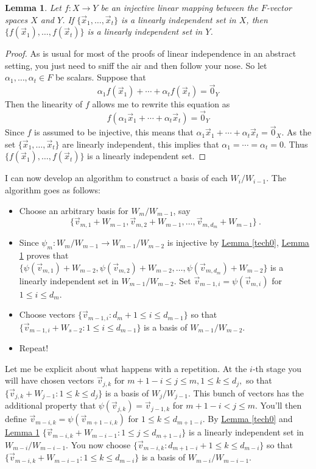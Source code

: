 \documentclass[11pt]{amsbook}
\newtheorem{lemma}[theorem]{Lemma}
\theoremstyle{definition}
\begin{document}
\begin{lemma}\label{tech1}
Let $f: X \to Y$ be an injective linear mapping between the $F$-vector spaces $X$ and $Y$. If $\{ \vec{x}_1, \ldots , \vec{x}_t\}$ is a linearly independent set in $X$, then $\{ f(\vec{x}_1), \ldots , f(\vec{x}_t) \}$ is a linearly independent set in $Y$.
\end{lemma}
\begin{proof}
As is usual for most of the proofs of linear independence in an abstract setting, you just need to sniff the air and then follow your nose. So let $\alpha_1, \ldots ,\alpha_t\in F$ be scalars. Suppose that $$\alpha_1f(\vec{x}_1) + \cdots + \alpha_t f(\vec{x}_t) =\vec{0}_Y$$ Then the linearity of $f$ allows me to rewrite  this equation as $$f(\alpha_1\vec{x}_1 + \cdots + \alpha_t \vec{x}_t) = \vec{0}_Y$$ Since $f$ is assumed to be injective, this means that $\alpha_1\vec{x}_1 + \cdots + \alpha_t \vec{x}_t = \vec{0}_X$. As the set $\{ \vec{x}_1, \ldots , \vec{x}_t \}$ are linearly independent, this implies that $\alpha_1 = \cdots = \alpha_t = 0$. Thus $\{ f(\vec{x}_1), \ldots , f(\vec{x}_t) \}$ is a linearly independent set.
\end{proof}

I can now develop an algorithm to construct a basis of each $W_i/W_{i-1}$. The algorithm goes as follows:
\begin{itemize}
\item Choose an arbitrary basis for $W_m/W_{m-1}$, say 
$$\{ \vec{v}_{m,1} + W_{m-1}, \vec{v}_{m,2} + W_{m-1} , \ldots , \vec{v}_{m, d_m} + W_{m-1}\}~.$$
\item Since $\psi_m : W_m/W_{m-1} \to W_{m-1}/W_{m-2}$ is injective by \hyperref[tech0]{Lemma \ref{tech0}}, \hyperref[tech1]{Lemma \ref{tech1}} proves that $\{  \psi(\vec{v}_{m,1}) + W_{m-2}, \psi(\vec{v}_{m,2}) + W_{m-2} , \ldots , \psi(\vec{v}_{m,d_m}) + W_{m-2}\}$ is a linearly independent set in $W_{m-1}/W_{m-2}$. Set $\vec{v}_{m-1,i} = \psi(\vec{v}_{m,i})$ for $1\leqslant i \leqslant d_m$.
\item Choose vectors $\{ \vec{v}_{m-1,i}: d_m+1\leqslant i \leqslant d_{m-1}\}$ so that $\{ \vec{v}_{m-1,i} + W_{s-2} : 1\leqslant i \leqslant d_{m-1} \}$ is a basis of $W_{m-1}/W_{m-2}$.
\item Repeat!
\end{itemize}
Let me be explicit about what happens with a repetition. At the $i$-th stage you will have chosen vectors $\vec{v}_{j,k} \text{ for } m+1-i \leqslant j \leqslant m, 1\leqslant k \leqslant d_{j},$ so that $\{ \vec{v}_{j,k} + W_{j-1} : 1\leqslant k \leqslant d_j\}$ is a basis of $W_{j}/W_{j-1}$. This bunch of vectors has the additional property that  $\psi(\vec{v}_{j,k}) = \vec{v}_{j-1,k}$ for $m+1-i < j \leqslant m$. You'll then define $\vec{v}_{m-i, k} = \psi(\vec{v}_{m+1-i, k})$ for $1\leqslant k \leqslant d_{m+1-i}$. By \hyperref[tech0]{Lemma \ref{tech0}} and \hyperref[tech1]{Lemma \ref{tech1}} $\{ \vec{v}_{m-i, k} + W_{m-i-1} : 1\leqslant j \leqslant d_{m+1-i} \}$ is a linearly independent set in $W_{m-i}/W_{m-i-1}$. You now choose $\{ \vec{v}_{m-i, k} : d_{m+1-i}+1\leqslant k \leqslant d_{m-i} \}$ so that $\{ \vec{v}_{m-i, k} + W_{m-i-1}: 1\leqslant k \leqslant d_{m-i} \}$ is a basis of $W_{m-i}/W_{m-i-1}$.
\end{document}
